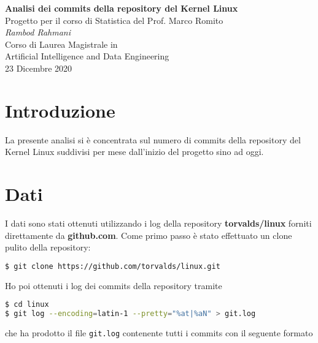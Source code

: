 \documentclass[11pt,a4paper]{article}
\begin{document}
\begin{center}
	\Large\textbf{Analisi dei commits della repository del Kernel Linux}\\
	\vspace{0.2cm}
	\large{Progetto per il corso di Statistica del Prof. Marco Romito}\\
	\vspace{0.5cm}
	\large\textit{Rambod Rahmani}\\
	\vspace{0.2cm}
	\scriptsize{Corso di Laurea Magistrale in\\Artificial Intelligence and
	Data Engineering}\\
	\vspace{0.5cm}
	\normalsize{23 Dicembre 2020}
\end{center}

\tableofcontents

\section{Introduzione}
La presente analisi si \`e concentrata sul numero di commits della repository
del Kernel Linux suddivisi per mese dall'inizio del progetto sino ad oggi.
\section{Dati}
I dati sono stati ottenuti utilizzando i log della repository
\textbf{torvalds/linux} forniti direttamente da \textbf{github.com}. Come primo
passo \`e stato effettuato un clone pulito della repository:
\begin{lstlisting}[language=bash,basicstyle=\scriptsize,tabsize=2,frame = single]
$ git clone https://github.com/torvalds/linux.git
\end{lstlisting}
Ho poi ottenuti i log dei commits della repository tramite
\begin{lstlisting}[language=bash,basicstyle=\scriptsize,tabsize=2,frame = single]
$ cd linux
$ git log --encoding=latin-1 --pretty="%at|%aN" > git.log
\end{lstlisting}
che ha prodotto il file \texttt{git.log} contenente tutti i commits con il
seguente formato\\
\end{document}

